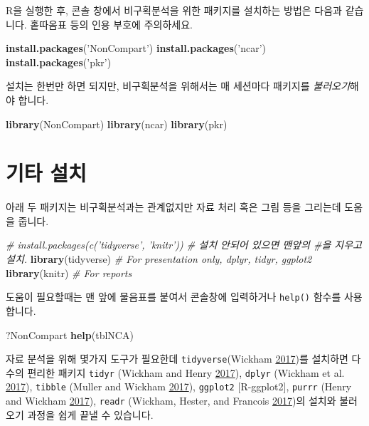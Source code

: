 \documentclass[12pt,]{krantz}
\newenvironment{Shaded}{\begin{snugshade}}{\end{snugshade}}
\newcommand{\KeywordTok}[1]{\textcolor[rgb]{0.13,0.29,0.53}{\textbf{#1}}}
\newcommand{\StringTok}[1]{\textcolor[rgb]{0.31,0.60,0.02}{#1}}
\newcommand{\CommentTok}[1]{\textcolor[rgb]{0.56,0.35,0.01}{\textit{#1}}}
\newcommand{\NormalTok}[1]{#1}
\theoremstyle{definition}
\theoremstyle{definition}
\theoremstyle{definition}
\theoremstyle{remark}
\begin{document}
R을 실행한 후, 콘솔 창에서 비구획분석을 위한 패키지를 설치하는 방법은
다음과 같습니다. 홑따옴표 등의 인용 부호에 주의하세요.

\begin{Shaded}
\begin{Highlighting}[]
\KeywordTok{install.packages}\NormalTok{(}\StringTok{'NonCompart'}\NormalTok{)}
\KeywordTok{install.packages}\NormalTok{(}\StringTok{'ncar'}\NormalTok{)}
\KeywordTok{install.packages}\NormalTok{(}\StringTok{'pkr'}\NormalTok{)}
\end{Highlighting}
\end{Shaded}

설치는 한번만 하면 되지만, 비구획분석을 위해서는 매 세션마다 패키지를
\emph{불러오기}해야 합니다.

\begin{Shaded}
\begin{Highlighting}[]
\KeywordTok{library}\NormalTok{(NonCompart)}
\KeywordTok{library}\NormalTok{(ncar)}
\KeywordTok{library}\NormalTok{(pkr)}
\end{Highlighting}
\end{Shaded}

\section{기타 설치}\label{-}

아래 두 패키지는 비구획분석과는 관계없지만 자료 처리 혹은 그림 등을
그리는데 도움을 줍니다.

\begin{Shaded}
\begin{Highlighting}[]
\CommentTok{# install.packages(c('tidyverse', 'knitr')) # 설치 안되어 있으면 맨앞의 #을 지우고 설치.}
\KeywordTok{library}\NormalTok{(tidyverse) }\CommentTok{# For presentation only, dplyr, tidyr, ggplot2}
\KeywordTok{library}\NormalTok{(knitr) }\CommentTok{# For reports}
\end{Highlighting}
\end{Shaded}

도움이 필요할때는 맨 앞에 물음표를 붙여서 콘솔창에 입력하거나
\texttt{help()} 함수를 사용합니다.

\begin{Shaded}
\begin{Highlighting}[]
\NormalTok{?NonCompart}
\KeywordTok{help}\NormalTok{(tblNCA)}
\end{Highlighting}
\end{Shaded}

자료 분석을 위해 몇가지 도구가 필요한데 \texttt{tidyverse}(Wickham
\protect\hyperlink{ref-R-tidyverse}{2017})를 설치하면 다수의 편리한
패키지 \texttt{tidyr} (Wickham and Henry
\protect\hyperlink{ref-R-tidyr}{2017}), \texttt{dplyr} (Wickham et al.
\protect\hyperlink{ref-R-dplyr}{2017}), \texttt{tibble} (Muller and
Wickham \protect\hyperlink{ref-R-tibble}{2017}), \texttt{ggplot2}
{[}R-ggplot2{]}, \texttt{purrr} (Henry and Wickham
\protect\hyperlink{ref-R-purrr}{2017}), \texttt{readr} (Wickham, Hester,
and Francois \protect\hyperlink{ref-R-readr}{2017})의 설치와 불러오기
과정을 쉽게 끝낼 수 있습니다.
\end{document}
